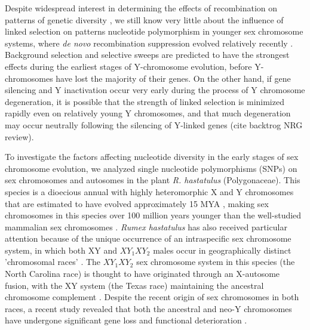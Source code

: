 \documentclass[9pt,twocolumn,twoside]{gsajnl}
\begin{document}


Despite widespread interest in determining the effects of recombination on patterns of genetic diversity \citep{ellegren2011,bachtrog2013NRG}, we still know very little about the influence of linked selection on patterns nucleotide polymorphism in younger sex chromosome systems, where \textit{de novo} recombination suppression evolved relatively recently \citep{charlesworth2016plant}. Background selection and selective sweeps are predicted to have the strongest effects during the earliest stages of Y-chromosome evolution, before Y-chromosomes have lost the majority of their genes. On the other hand, if gene silencing and Y inactivation occur very early during the process of Y chromosome degeneration, it is possible that the strength of linked selection is minimized rapidly even on relatively young Y chromosomes, and that much degeneration may occur neutrally following the silencing of Y-linked genes (cite backtrog NRG review). 

To investigate the factors affecting nucleotide diversity in the early stages of sex chromosome evolution, we analyzed single nucleotide polymorphisms (SNPs) on sex chromosomes and autosomes in the plant \textit{R. hastatulus }(Polygonaceae). This species is a dioecious annual with highly heteromorphic X and Y chromosomes that are estimated to have evolved  approximately 15 MYA \citep{quesada2011,grabowska2015,navajas2005}, making sex chromosomes in this species over 100 million years younger than the well-studied mammalian sex chromosomes \citep{lahn1999,ross2005dna}. \textit{Rumex hastatulus} has also received particular attention because of the unique occurrence of an intraspecific sex chromosome system, in which both XY and $XY_{1}XY_{2}$ males occur in geographically distinct 'chromosomal races' \citep{smith1963mechanism}. The $XY_{1}XY_{2}$ sex chromosome system in this species (the North Carolina race) is thought to have originated through an X-autosome fusion, with the XY system (the Texas race) maintaining the ancestral chromosome complement \citep{smith1964evolving}. Despite the recent origin of sex chromosomes in both races, a recent study revealed that both the ancestral and neo-Y chromosomes have undergone significant gene loss and functional deterioration \citep{hough2014}.
\end{document}
